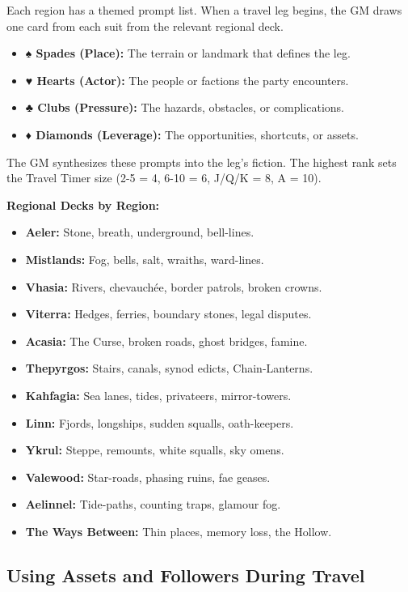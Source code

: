 Each region has a themed prompt list. When a travel leg begins, the GM draws one card from each suit from the relevant regional deck.

\begin{itemize}
\item \textbf{♠ Spades (Place):} The terrain or landmark that defines the leg.
\item \textbf{♥ Hearts (Actor):} The people or factions the party encounters.
\item \textbf{♣ Clubs (Pressure):} The hazards, obstacles, or complications.
\item \textbf{♦ Diamonds (Leverage):} The opportunities, shortcuts, or assets.
\end{itemize}

The GM synthesizes these prompts into the leg's fiction. The highest rank sets the Travel Timer size (2-5 = 4, 6-10 = 6, J/Q/K = 8, A = 10).

\textbf{Regional Decks by Region:}
\begin{itemize}
\item \textbf{Aeler:} Stone, breath, underground, bell-lines.
\item \textbf{Mistlands:} Fog, bells, salt, wraiths, ward-lines.
\item \textbf{Vhasia:} Rivers, chevauchée, border patrols, broken crowns.
\item \textbf{Viterra:} Hedges, ferries, boundary stones, legal disputes.
\item \textbf{Acasia:} The Curse, broken roads, ghost bridges, famine.
\item \textbf{Thepyrgos:} Stairs, canals, synod edicts, Chain-Lanterns.
\item \textbf{Kahfagia:} Sea lanes, tides, privateers, mirror-towers.
\item \textbf{Linn:} Fjords, longships, sudden squalls, oath-keepers.
\item \textbf{Ykrul:} Steppe, remounts, white squalls, sky omens.
\item \textbf{Valewood:} Star-roads, phasing ruins, fae geases.
\item \textbf{Aelinnel:} Tide-paths, counting traps, glamour fog.
\item \textbf{The Ways Between:} Thin places, memory loss, the Hollow.
\end{itemize}

\subsection*{Using Assets and Followers During Travel}
\label{sec:travel-assets}

